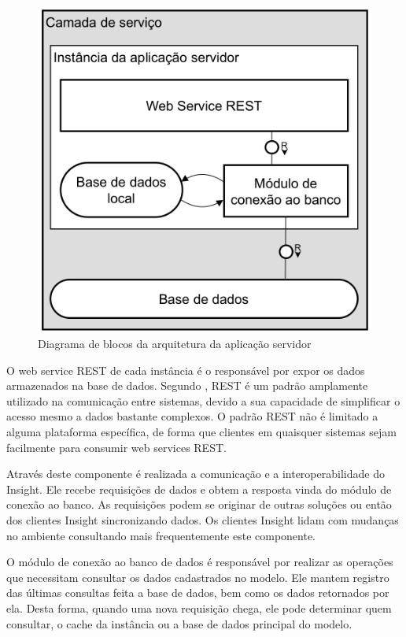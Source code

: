 \documentclass[twoside,english,brazilian]{UNISINOSartigo}
\begin{document}
\begin{figure}[!ht]
	\caption{Diagrama de blocos da arquitetura da aplicação servidor}
	\label{fig:arquiteturaInstancia}
	\centering%
	\begin{minipage}{.5\textwidth}
		\includegraphics[width=\textwidth]{imgs/arquiteturaInstancia.png}
	\end{minipage}
\end{figure}

O web service REST de cada instância é o responsável por expor os dados armazenados na base de dados. Segundo , REST é um padrão amplamente utilizado na comunicação entre sistemas, devido a sua capacidade de simplificar o acesso mesmo a dados bastante complexos. O padrão REST não é limitado a alguma plataforma específica, de forma que clientes em quaisquer sistemas sejam facilmente para consumir web services REST. 

Através deste componente é realizada a comunicação e a interoperabilidade do Insight. Ele recebe requisições de dados e obtem a resposta vinda do módulo de conexão ao banco. As requisições podem se originar de outras soluções ou então dos clientes Insight sincronizando dados. Os clientes Insight lidam com mudanças no ambiente consultando mais frequentemente este componente.

O módulo de conexão ao banco de dados é responsável por realizar as operações que necessitam consultar os dados cadastrados no modelo. Ele mantem registro das últimas consultas feita a base de dados, bem como os dados retornados por ela. Desta forma, quando uma nova requisição chega, ele pode determinar quem consultar, o cache da instância ou a base de dados principal do modelo.
\end{document}
